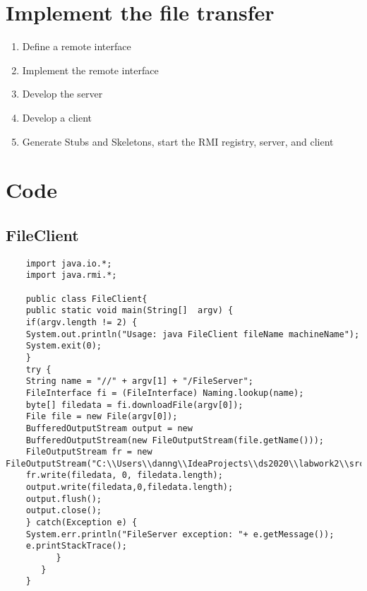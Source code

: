 \documentclass[12pt]{article}
\begin{document}
	\section{ Implement the file transfer}
	\begin{enumerate}
		\item Define a remote interface
		\item	Implement the remote interface
		\item	Develop the server
		\item	Develop a client
		\item	Generate Stubs and Skeletons, start the RMI registry, server, and client
		
	\end{enumerate}
	\section{Code}
	\subsection{FileClient}
	\begin{lstlisting}
	import java.io.*;
	import java.rmi.*;
	
	public class FileClient{
	public static void main(String[]  argv) {
	if(argv.length != 2) {
	System.out.println("Usage: java FileClient fileName machineName");
	System.exit(0);
	}
	try {
	String name = "//" + argv[1] + "/FileServer";
	FileInterface fi = (FileInterface) Naming.lookup(name);
	byte[] filedata = fi.downloadFile(argv[0]);
	File file = new File(argv[0]);
	BufferedOutputStream output = new
	BufferedOutputStream(new FileOutputStream(file.getName()));
	FileOutputStream fr = new FileOutputStream("C:\\Users\\danng\\IdeaProjects\\ds2020\\labwork2\\src\\test_rmi_result.txt");
	fr.write(filedata, 0, filedata.length);
	output.write(filedata,0,filedata.length);
	output.flush();
	output.close();
	} catch(Exception e) {
	System.err.println("FileServer exception: "+ e.getMessage());
	e.printStackTrace();
	      }
	   }
	}
	\end{lstlisting}
	
\end{document}

